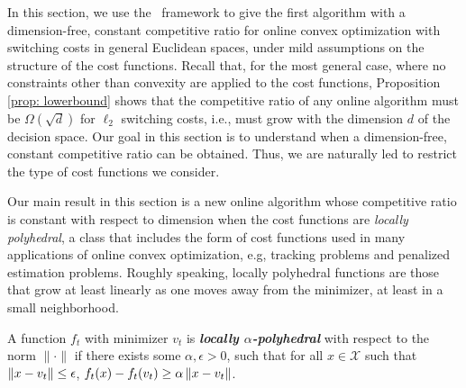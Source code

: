 
In this section, we use the \ourack\ framework to give the first algorithm with a dimension-free, constant competitive ratio for online convex optimization with switching costs in general Euclidean spaces, under mild assumptions on the structure of the cost functions.  Recall that, for the most general case, where no constraints other than convexity are applied to the cost functions, Proposition \ref{prop: lowerbound} shows that the competitive ratio of any online algorithm must be $\Omega(\sqrt{d})$ for $\ell_2$ switching costs, i.e., must grow with the dimension $d$ of the decision space. Our goal in this section is to understand when a dimension-free, constant competitive ratio can be obtained.  Thus, we are naturally led to restrict the type of cost functions we consider. 
 
Our main result in this section is a new online algorithm whose competitive ratio is constant with respect to dimension when the cost functions are \emph{locally polyhedral}, a class that includes the form of cost functions used in many applications of online convex optimization, e.g, tracking problems and penalized estimation problems. Roughly speaking, locally polyhedral functions are those that grow at least linearly as one moves away from the minimizer, at least in a small neighborhood. 

\begin{definition}
A function $f_t$ with minimizer $v_t$ is \textbf{\textit{locally $\alpha$-polyhedral}} with respect to the norm $\| \cdot \|$ if there exists some $\alpha, \epsilon > 0$, such that for all $x \in \mathcal{X}$ such that $\left\lVert x - v_t \right\rVert \le \epsilon$, $f_t(x) - f_t(v_t)\ge  \alpha \left\lVert x - v_t \right\rVert$.
\label{locallypolyhedraldef}
\end{definition}

